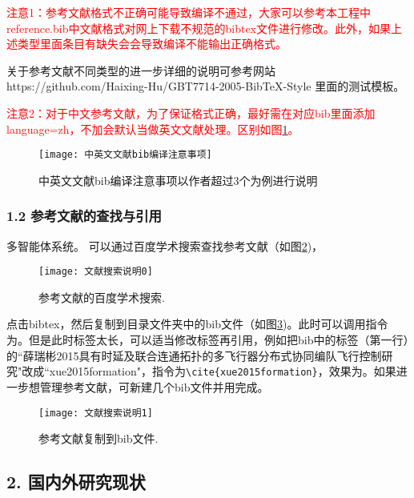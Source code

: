 \documentclass[bachelor_p]{open-report}
\begin{document}
\textcolor{red}{注意1：参考文献格式不正确可能导致编译不通过，大家可以参考本工程中reference.bib中文献格式对网上下载不规范的bibtex文件进行修改。此外，如果上述类型里面条目有缺失会会导致编译不能输出正确格式。}

关于参考文献不同类型的进一步详细的说明可参考网站https://github.com/Haixing-Hu/GBT7714-2005-BibTeX-Style
里面的测试模板。


\textcolor{red}{注意2：对于中文参考文献，为了保证格式正确，最好需在对应bib里面添加language={zh}，不加会默认当做英文文献处理。区别如图\ref{fig_bib0}。}

\begin{figure}[!htb]
  \centering
  \texttt{[image: 中英文文献bib编译注意事项]}
  \caption{中英文文献bib编译注意事项以作者超过3个为例进行说明}
  \label{fig_bib0}
\end{figure}


\subsubsection{1.2 参考文献的查找与引用}


多智能体系统\citep{cao2011formation}。
可以通过百度学术搜索查找参考文献（如图\ref{fig_search0})，
 \begin{figure}[!htb]
  \centering
  \texttt{[image: 文献搜索说明0]}
  \caption{参考文献的百度学术搜索.}
  \label{fig_search0}
\end{figure}
点击bibtex，然后复制到目录文件夹中的bib文件（如图\ref{fig_search1})。此时可以调用指令为\citep{薛瑞彬2015具有时延及联合连通拓扑的多飞行器分布式协同编队飞行控制研究}。但是此时标签太长，可以适当修改标签再引用，例如把bib中的标签（第一行）的``薛瑞彬2015具有时延及联合连通拓扑的多飞行器分布式协同编队飞行控制研究"改成``xue2015formation"，指令为\verb+\cite{xue2015formation}+，效果为\cite{xue2015formation}。如果进一步想管理参考文献，可新建几个bib文件并用\verb++完成。
 \begin{figure}[!htb]
  \centering
  \texttt{[image: 文献搜索说明1]}
  \caption{参考文献复制到bib文件.}
  \label{fig_search1}
\end{figure}









\subsection{2. 国内外研究现状}
\end{document}

